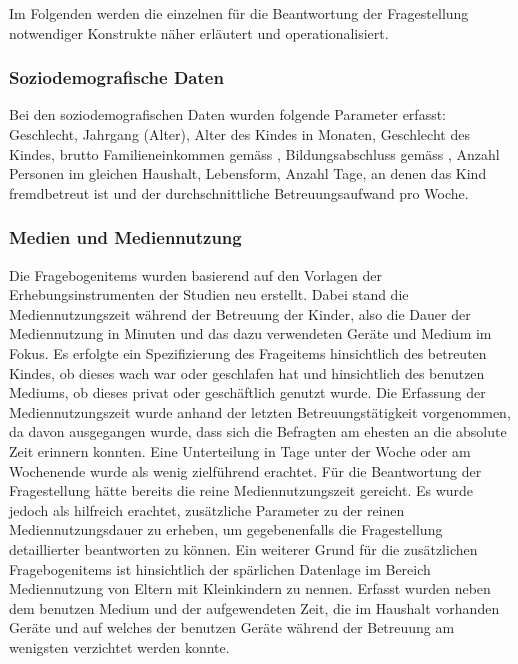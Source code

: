 Im Folgenden werden die einzelnen für die Beantwortung der Fragestellung notwendiger Konstrukte näher erläutert und operationalisiert.

\subsubsection{Soziodemografische Daten}\label{sec:SoziodemografischeDaten}
Bei den soziodemografischen Daten wurden folgende Parameter erfasst: Geschlecht, Jahrgang (Alter), Alter des Kindes in Monaten, Geschlecht des Kindes, brutto Familieneinkommen gemäss , Bildungsabschluss gemäss , Anzahl Personen im gleichen Haushalt, Lebensform, Anzahl Tage, an denen das Kind fremdbetreut ist und der durchschnittliche Betreuungsaufwand pro Woche.

\subsubsection{Medien und Mediennutzung}\label{sec:MedienMediennutzung}
Die Fragebogenitems wurden basierend auf den Vorlagen der Erhebungsinstrumenten der Studien  neu erstellt. Dabei stand die Mediennutzungszeit während der Betreuung der Kinder, also die Dauer der Mediennutzung in Minuten und das dazu verwendeten Geräte und Medium im Fokus. Es erfolgte ein Spezifizierung des Frageitems hinsichtlich des betreuten Kindes, ob dieses wach war oder geschlafen hat und hinsichtlich des benutzen Mediums, ob dieses privat oder geschäftlich genutzt wurde. Die Erfassung der Mediennutzungszeit wurde anhand der letzten Betreuungstätigkeit vorgenommen, da davon ausgegangen wurde, dass sich die Befragten am ehesten an die absolute Zeit erinnern konnten. Eine Unterteilung in Tage unter der Woche oder am Wochenende wurde als wenig zielführend erachtet. Für die Beantwortung der Fragestellung hätte bereits die reine Mediennutzungszeit gereicht. Es wurde jedoch als hilfreich erachtet, zusätzliche Parameter zu der reinen Mediennutzungsdauer zu erheben, um gegebenenfalls die Fragestellung detaillierter beantworten zu können. Ein weiterer Grund für die zusätzlichen Fragebogenitems ist hinsichtlich der spärlichen Datenlage im Bereich Mediennutzung von Eltern mit Kleinkindern zu nennen. Erfasst wurden neben dem benutzen Medium und der aufgewendeten Zeit, die im Haushalt vorhanden Geräte und auf welches der benutzen Geräte während der Betreuung am wenigsten verzichtet werden konnte. 

